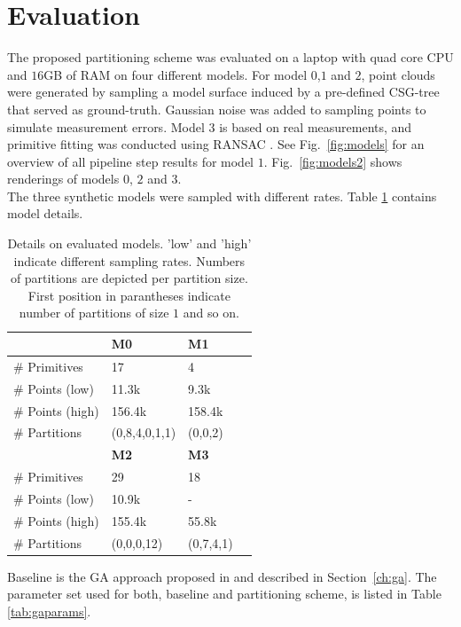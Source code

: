 \section{Evaluation}
\label{sec:eval}
The proposed partitioning scheme was evaluated on a laptop with quad core CPU and $16$GB of RAM on four different models.
For model $0$,$1$ and $2$, point clouds were generated by sampling a model surface induced by a pre-defined \ac{CSG}-tree that served as ground-truth. Gaussian noise was added to sampling points to simulate measurement errors.
Model $3$ is based on real measurements, and primitive fitting was conducted using RANSAC \cite{schnabel2007efficient}.
See Fig.~\ref{fig:models} for an overview of all pipeline step results for model $1$.
Fig.~\ref{fig:models2} shows renderings of models $0$, $2$ and $3$.
\\
The three synthetic models were sampled with different rates.
Table \ref{tab::models} contains model details. 
\begin{table}[h]
	\centering
	\begin{tabular}{|l|l|l|l|}
	\hline
	 & \textbf{M0} & \textbf{M1} \\
	\hline
	\# Primitives & 17 & 4  \\
	\hline
	\# Points (low) & 11.3k & 9.3k\\
	\hline
	\# Points (high) & 156.4k & 158.4k\\
	\hline
	\# Partitions & (0,8,4,0,1,1) & (0,0,2) \\
	\hline
	& \textbf{M2} & \textbf{M3} \\
	\hline
	\# Primitives & 29 & 18  \\
	\hline
	\# Points (low) & 10.9k & - \\
	\hline
	\# Points (high) & 155.4k & 55.8k \\
	\hline
	\# Partitions & (0,0,0,12) & (0,7,4,1) \\	
	\hline	
	\end{tabular}
	\caption{Details on evaluated models. 'low' and 'high' indicate different sampling rates. Numbers of partitions are depicted per partition size. First position in parantheses indicate number of partitions of size $1$ and so on.}
	\label{tab::models}
\end{table}
Baseline is the \ac{GA} approach proposed in \cite{fayolle2016evolutionary} and described in Section~\ref{ch:ga}. The parameter set used for both, baseline and partitioning scheme, is listed in Table \ref{tab:gaparams}.
